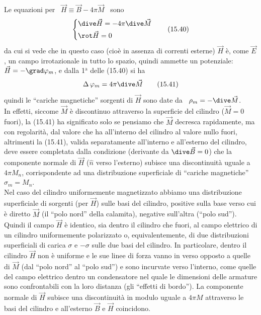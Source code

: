 Le equazioni per \ $\vec H\equiv\vec B-4\pi\vec M$ \ sono
\begin{equation}
  \left\{
  \begin{aligned}
    &\dive\vec H=-4\pi\dive\vec M\\
    &\rot\vec H=0
  \end{aligned}
  \right.
  \tag{15.40}
\end{equation}
da cui si vede che in questo caso (cio\`e in assenza di correnti esterne)
$\vec H$ \`e, come $\vec E$, un campo irrotazionale in tutto lo spazio, quindi
ammette un potenziale: \ $\vec H=-\grad\varphi_m$, e dalla 1$^\mathrm{a}$ delle
(15.40) si ha
\begin{equation}
  \Delta\,\varphi_m=4\pi\dive\vec M
  \tag{15.41}
\end{equation}
quindi le ``cariche magnetiche'' sorgenti di $\vec H$ sono date da
\ $\rho_m=-\dive\vec M$.\\
In effetti, siccome $\vec M$ \`e discontinuo attraverso la superficie del
cilindro ($\vec M=0$ fuori), la (15.41) ha significato solo se pensiamo che
$\vec M$ decresca rapidamente, ma con regolarit\`a, dal valore che ha
all'interno del cilindro al valore nullo fuori, altrimenti la (15.41), valida
separatamente all'interno e all'esterno del cilindro, deve essere completata
dalla
condizione (derivante da $\dive\vec B=0$) che la componente normale di $\vec H$
($\hat n$ verso l'esterno) subisce una discontinuit\`a uguale a $4\pi M_n$,
corrispondente ad una distribuzione superficiale di ``cariche magnetiche''
$\sigma_m=M_n$.\\
Nel caso del cilindro uniformemente magnetizzato abbiamo una distribuzione
superficiale di sorgenti (per $\vec H$) sulle basi del cilindro, positive sulla
base verso cui \`e diretto $\vec M$ (il ``polo nord'' della calamita), negative
sull'altra (``polo sud''). Quindi il campo $\vec H$ \`e identico, sia dentro il
cilindro che fuori, al campo elettrico di un cilindro uniformemente polarizzato
o, equivalentemente, di due distribuzioni superficiali di carica $\sigma$ e
$-\sigma$ sulle due basi del cilindro. In particolare, dentro il cilindro
$\vec H$ non \`e uniforme e le sue linee di forza vanno in verso opposto a
quelle di $\vec M$ (dal ``polo nord'' al ``polo sud'') e sono incurvate verso
l'interno, come quelle del campo elettrico dentro un condensatore nel quale le
dimensioni delle armature sono confrontabili con la loro distanza (gli ``effetti
di bordo''). La componente normale di $\vec H$ subisce una discontinuit\`a in
modulo uguale a $4\pi M$ attraverso le basi del cilindro e all'esterno $\vec B$
e $\vec H$ coincidono.

